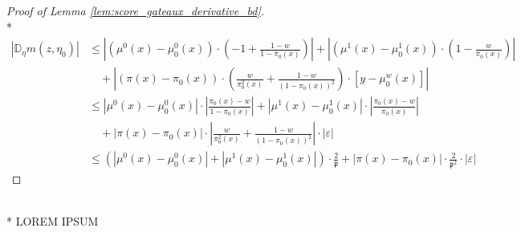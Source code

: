 \begin{proof}[Proof of Lemma \ref{lem:score_gateaux_derivative_bd}]\mbox{}\\*
    \begin{equation}
        \begin{aligned}
            \left| \mathbb{D}_{\eta} m(z, \eta_{0}) \right|
            & \leq \left|(\mu^{0}(x) - \mu_{0}^{0}(x)) \cdot \left(-1 + \frac{1 - w}{1 - \pi_{0}(x) }\right)\right|
            + \left| (\mu^{1}(x) - \mu_{0}^{1}(x)) \cdot \left(1 - \frac{w}{\pi_{0}(x)}\right)\right|\\
            & \quad + \left| (\pi(x) - \pi_{0}(x)) \cdot \left(\frac{w}{\pi_{0}^{2}(x)} + \frac{1-w}{\left(1-\pi_{0}(x)\right)^{2}}\right) \cdot \left[y - \mu_{0}^{w}(x)\right]\right| \\
            & \leq \left| \mu^{0}(x) - \mu_{0}^{0}(x) \right| \cdot \left|\frac{\pi_{0}(x) - w}{1 - \pi_{0}(x)}\right|
            + \left| \mu^{1}(x) - \mu_{0}^{1}(x) \right| \cdot \left|\frac{\pi_{0}(x) - w}{\pi_{0}(x)}\right|\\
            & \quad + \left| \pi(x) - \pi_{0}(x) \right| \cdot \left|\frac{w}{\pi_{0}^{2}(x)} + \frac{1-w}{\left(1-\pi_{0}(x)\right)^{2}} \right| \cdot \left| \varepsilon \right| \\
            & \leq \left(\left| \mu^{0}(x) - \mu_{0}^{0}(x) \right| + \left| \mu^{1}(x) - \mu_{0}^{1}(x) \right|\right) \cdot \frac{2}{\mathfrak{p}}
            + \left| \pi(x) - \pi_{0}(x) \right| \cdot \frac{2}{\mathfrak{p}^{2}} \cdot \left| \varepsilon \right|
        \end{aligned}
    \end{equation}
\end{proof}

\begin{boxD}
    \begin{lem}\label{lem:score_2gateaux_derivative}\mbox{}\\*
    {\color{red} LOREM IPSUM}
\end{lem}
\end{boxD}

